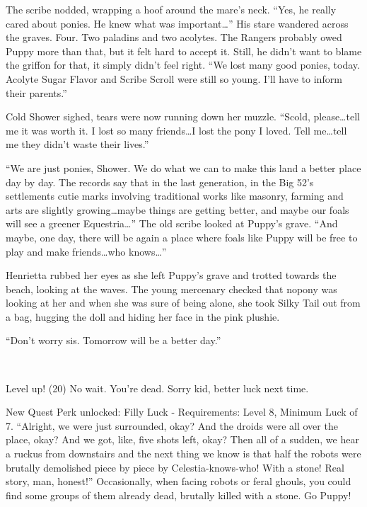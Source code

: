 The scribe nodded, wrapping a hoof around the mare's neck. ``Yes, he really cared about ponies. He knew what was important\dots'' His stare wandered across the graves. Four. Two paladins and two acolytes. The Rangers probably owed Puppy more than that, but it felt hard to accept it. Still, he didn't want to blame the griffon for that, it simply didn't feel right. ``We lost many good ponies, today. Acolyte Sugar Flavor and Scribe Scroll were still so young. I'll have to inform their parents.''

Cold Shower sighed, tears were now running down her muzzle. ``Scold, please\dots tell me it was worth it. I lost so many friends\dots I lost the pony I loved. Tell me\dots tell me they didn't waste their lives.''

``We are just ponies, Shower. We do what we can to make this land a better place day by day. The records say that in the last generation, in the Big 52's settlements cutie marks involving traditional works like masonry, farming and arts are slightly growing\dots maybe things are getting better, and maybe our foals will see a greener Equestria\dots'' The old scribe looked at Puppy's grave. ``And maybe, one day, there will be again a place where foals like Puppy will be free to play and make friends\dots who knows\dots''

Henrietta rubbed her eyes as she left Puppy's grave and trotted towards the beach, looking at the waves. The young mercenary checked that nopony was looking at her and when she was sure of being alone, she took Silky Tail out from a bag, hugging the doll and hiding her face in the pink plushie.

``Don't worry sis. Tomorrow will be a better day.''

\clearpage

~\vfill

\begin{engnote}
    Level up! (20) No wait. You're dead. Sorry kid, better luck next time.
    
    New Quest Perk unlocked: Filly Luck - Requirements: Level 8, Minimum Luck of 7. ``Alright, we were just surrounded, okay? And the droids were all over the place, okay? And we got, like, five shots left, okay? Then all of a sudden, we hear a ruckus from downstairs and the next thing we know is that half the robots were brutally demolished piece by piece by Celestia-knows-who! With a stone! Real story, man, honest!'' Occasionally, when facing robots or feral ghouls, you could find some groups of them already dead, brutally killed with a stone. Go Puppy!
\end{engnote}

